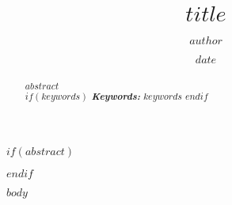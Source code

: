 \documentclass{article}
\title{$title$}
\author{$author$}
\date{$date$}
\begin{document}
\maketitle

$if(abstract)$
\begin{abstract}
$abstract$ \\[12pt]
$if(keywords)$
\textbf{\itshape Keywords:} $keywords$
$endif$
\end{abstract}
$endif$


$body$
\end{document}
